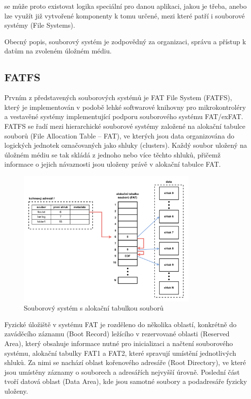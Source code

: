 se  může proto existovat logika speciální pro danou aplikaci, jakou je třeba, anebo lze využít již vytvořené komponenty k tomu určené, mezi které patří i souborové systémy (File Systems).

Obecný popis, souborový systém je zodpovědný za organizaci, správu a přístup k datům na zvoleném úložném médiu.

\subsection{FATFS}
\label{fatfs}
Prvním z představených souborových systémů je FAT File System (FATFS), který je implementován v podobě lehké softwarové knihovny pro mikrokontroléry a vestavěné systémy implementující podporu souborového systému FAT/exFAT. FATFS se řadí mezi hierarchické souborové systémy založené na alokační tabulce souborů (File Allocation Table – FAT), ve kterých jsou data organizována do logických jednotek označovaných jako shluky (clusters). Každý soubor uložený na úložném médiu se tak skládá z jednoho nebo více těchto shluků, přičemž informace o jejich návaznosti jsou uloženy právě v alokační tabulce FAT. \cite{recoverit_fat_filesystem, elm_fat_filesystem_docs}

\begin{figure}[h]
    \centering
    \includegraphics[width=0.80\textwidth]{obrazky-figures/fat_file_system-cz.pdf}
    
    \caption{Souborový systém s alokační tabulkou souborů \cite{recoverit_fat_filesystem}}
    \label{fig:fat-file-system-structure}
\end{figure}

Fyzické úložiště v systému FAT je rozděleno do několika oblastí, konkrétně do zaváděcího záznamu (Boot Record) ležícího v rezervované oblasti (Reserved Area), který obsahuje informace nutné pro inicializaci a načtení souborového systému, alokační tabulky FAT1 a FAT2, které spravují umístění jednotlivých shluků.  Za nimi se nachází oblast kořenového adresáře (Root Directory), ve které jsou umístěny záznamy o souborech a adresářích nejvyšší úrovně. Poslední část tvoří datová oblast (Data Area), kde jsou samotné soubory a podadresáře fyzicky uloženy.

